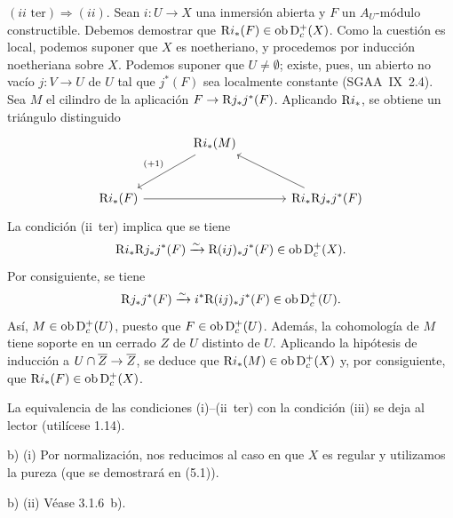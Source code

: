 $(ii\text{~ter}) \Rightarrow (ii)$. Sean $i : U \to X$ una inmersión abierta y $F$ un $A_U$-módulo constructible. Debemos demostrar que $\mathrm{R} i_{*}(F) \in \operatorname{ob} \mathrm{D}_c^{+}(X)$. Como la cuestión es local, podemos suponer que $X$ es noetheriano, y procedemos por inducción noetheriana sobre $X$. Podemos suponer que $U \neq \emptyset$; existe, pues, un abierto no vacío $j : V \to U$ de $U$ tal que $j^{*}(F)$ sea localmente constante (SGAA~IX~2.4). Sea $M$ el cilindro de la aplicación $F \to \mathrm{R} j_{*}j^{*}(F)$. Aplicando $\mathrm{R} i_{*}$, se obtiene un triángulo distinguido
\[
\begin{tikzcd}[column sep=large,row sep=large]
& \R i_{*}(M) \arrow[dl,"{(+1)}"'] & \\
\R i_{*}(F) \arrow[rr] & & \R i_{*}\R j_{*}j^{*}(F) \arrow[ul]
\end{tikzcd}
\]
La condición (ii~ter) implica que se tiene
\[
\mathrm{R} i_{*} \mathrm{R} j_{*} j^{*}(F) \xrightarrow{\sim} \mathrm{R}(ij)_{*} j^{*}(F) \in \operatorname{ob} \mathrm{D}_c^{+}(X).
\]
Por consiguiente, se tiene
\[
\mathrm{R} j_{*}j^{*}(F) \xrightarrow{\sim} i^{*} \mathrm{R}(ij)_{*} j^{*}(F) \in \operatorname{ob} \mathrm{D}_c^{+}(U).
\]
Así, $M \in \operatorname{ob} \mathrm{D}_c^{+}(U)$, puesto que $F \in \operatorname{ob} \mathrm{D}_c^{+}(U)$. Además, la cohomología de $M$ tiene soporte en un cerrado $Z$ de $U$ distinto de $U$. Aplicando la hipótesis de inducción a $U \cap \overline{Z} \to \overline{Z}$, se deduce que $\mathrm{R} i_{*}(M) \in \operatorname{ob} \mathrm{D}_c^{+}(X)$ y, por consiguiente, que $\mathrm{R} i_{*}(F) \in \operatorname{ob} \mathrm{D}_c^{+}(X)$.

La equivalencia de las condiciones (i)--(ii~ter) con la condición (iii) se deja al lector (utilícese 1.14).

b) (i) Por normalización, nos reducimos al caso en que $X$ es regular y utilizamos la pureza (que se demostrará en (5.1)).

b) (ii) Véase 3.1.6~b).
